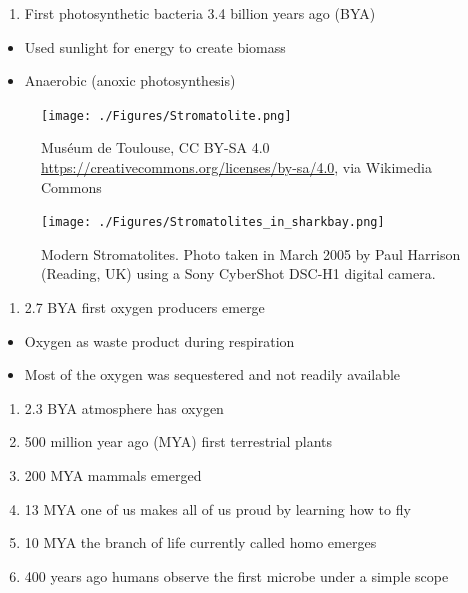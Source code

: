 \documentclass[
]{book}
\providecommand{\tightlist}{%
  \setlength{\itemsep}{0pt}\setlength{\parskip}{0pt}}
\begin{document}
\begin{enumerate}
\def\labelenumi{\arabic{enumi}.}
\setcounter{enumi}{1}
\tightlist
\item
  First photosynthetic bacteria 3.4 billion years ago (BYA)
\end{enumerate}

\begin{itemize}
\tightlist
\item
  Used sunlight for energy to create biomass
\item
  Anaerobic (anoxic photosynthesis)
\end{itemize}

\begin{figure}
\centering
\texttt{[image: ./Figures/Stromatolite.png]}
\caption{Muséum de Toulouse, CC BY-SA 4.0 \url{https://creativecommons.org/licenses/by-sa/4.0}, via Wikimedia Commons}
\end{figure}

\begin{figure}
\centering
\texttt{[image: ./Figures/Stromatolites\_in\_sharkbay.png]}
\caption{Modern Stromatolites. Photo taken in March 2005 by Paul Harrison (Reading, UK) using a Sony CyberShot DSC-H1 digital camera.}
\end{figure}

\begin{enumerate}
\def\labelenumi{\arabic{enumi}.}
\setcounter{enumi}{2}
\tightlist
\item
  2.7 BYA first oxygen producers emerge
\end{enumerate}

\begin{itemize}
\tightlist
\item
  Oxygen as waste product during respiration
\item
  Most of the oxygen was sequestered and not readily available
\end{itemize}

\begin{enumerate}
\def\labelenumi{\arabic{enumi}.}
\setcounter{enumi}{3}
\tightlist
\item
  2.3 BYA atmosphere has oxygen
\item
  500 million year ago (MYA) first terrestrial plants
\item
  200 MYA mammals emerged
\item
  13 MYA one of us makes all of us proud by learning how to fly
\item
  10 MYA the branch of life currently called homo emerges
\item
  400 years ago humans observe the first microbe under
  a simple scope
\end{enumerate}
\end{document}
